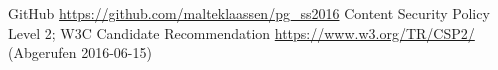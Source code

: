 \documentclass[handout]{beamer}
\begin{document}
\begin{frame}

\end{frame}

\begin{thebibliography}{}
GitHub \url{https://github.com/malteklaassen/pg_ss2016}
Content Security Policy Level 2; W3C Candidate Recommendation \url{https://www.w3.org/TR/CSP2/} (Abgerufen 2016-06-15)
\end{thebibliography}
\end{document}
